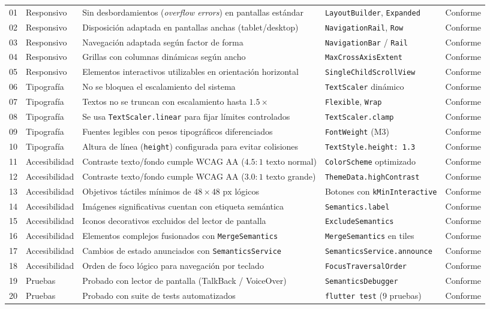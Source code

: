 \documentclass[12pt,a4paper]{article}
\begin{document}
\begin{small}
\begin{longtable}{p{0.8cm} p{2.5cm} p{5.5cm} p{3.2cm} p{1.8cm}}
01 & Responsivo & Sin desbordamientos (\textit{overflow errors}) en pantallas estándar & \texttt{LayoutBuilder}, \texttt{Expanded} & Conforme \\
02 & Responsivo & Disposición adaptada en pantallas anchas (tablet/desktop) & \texttt{NavigationRail}, \texttt{Row} & Conforme \\
03 & Responsivo & Navegación adaptada según factor de forma & \texttt{NavigationBar} / \texttt{Rail} & Conforme \\
04 & Responsivo & Grillas con columnas dinámicas según ancho & \texttt{MaxCrossAxisExtent} & Conforme \\
05 & Responsivo & Elementos interactivos utilizables en orientación horizontal & \texttt{SingleChildScrollView} & Conforme \\
06 & Tipografía & No se bloquea el escalamiento del sistema & \texttt{TextScaler} dinámico & Conforme \\
07 & Tipografía & Textos no se truncan con escalamiento hasta $1.5\times$ & \texttt{Flexible}, \texttt{Wrap} & Conforme \\
08 & Tipografía & Se usa \texttt{TextScaler.linear} para fijar límites controlados & \texttt{TextScaler.clamp} & Conforme \\
09 & Tipografía & Fuentes legibles con pesos tipográficos diferenciados & \texttt{FontWeight} (M3) & Conforme \\
10 & Tipografía & Altura de línea (\texttt{height}) configurada para evitar colisiones & \texttt{TextStyle.height: 1.3} & Conforme \\
11 & Accesibilidad & Contraste texto/fondo cumple WCAG AA ($4.5:1$ texto normal) & \texttt{ColorScheme} optimizado & Conforme \\
12 & Accesibilidad & Contraste texto/fondo cumple WCAG AA ($3.0:1$ texto grande) & \texttt{ThemeData.highContrast} & Conforme \\
13 & Accesibilidad & Objetivos táctiles mínimos de $48\times 48\text{ px}$ lógicos & Botones con \texttt{kMinInteractive} & Conforme \\
14 & Accesibilidad & Imágenes significativas cuentan con etiqueta semántica & \texttt{Semantics.label} & Conforme \\
15 & Accesibilidad & Iconos decorativos excluidos del lector de pantalla & \texttt{ExcludeSemantics} & Conforme \\
16 & Accesibilidad & Elementos complejos fusionados con \texttt{MergeSemantics} & \texttt{MergeSemantics} en tiles & Conforme \\
17 & Accesibilidad & Cambios de estado anunciados con \texttt{SemanticsService} & \texttt{SemanticsService.announce} & Conforme \\
18 & Accesibilidad & Orden de foco lógico para navegación por teclado & \texttt{FocusTraversalOrder} & Conforme \\
19 & Pruebas & Probado con lector de pantalla (TalkBack / VoiceOver) & \texttt{SemanticsDebugger} & Conforme \\
20 & Pruebas & Probado con suite de tests automatizados & \texttt{flutter test} (9 pruebas) & Conforme \\


\end{longtable}
\end{small}
\end{document}
